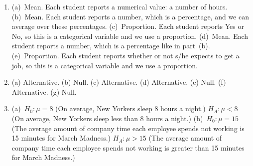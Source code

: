 \documentclass[
  10pt,
  openany]{book}
\providecommand{\tightlist}{%
  \setlength{\itemsep}{0pt}\setlength{\parskip}{0pt}}
\begin{document}
\begin{enumerate}
\def\labelenumi{\arabic{enumi}.}
\tightlist
\item
  (a)~Mean. Each student reports a numerical value: a number of hours. (b)~Mean. Each student reports a number, which is a percentage, and we can average over these percentages. (c)~Proportion. Each student reports Yes or No, so this is a categorical variable and we use a proportion. (d)~Mean. Each student reports a number, which is a percentage like in part~(b). (e)~Proportion. Each student reports whether or not s/he expects to get a job, so this is a categorical variable and we use a proportion.

  \addtocounter{enumi}{1}
\item
  (a) Alternative. (b) Null. (c) Alternative. (d) Alternative. (e) Null. (f) Alternative. (g) Null.

  \addtocounter{enumi}{1}
\item
  (a)~\(H_0: \mu = 8\) (On average, New Yorkers sleep 8 hours a night.) \(H_A: \mu < 8\) (On average, New Yorkers sleep less than 8 hours a night.) (b)~\(H_0: \mu = 15\) (The average amount of company time each employee spends not working is 15 minutes for March Madness.) \(H_A: \mu > 15\) (The average amount of company time each employee spends not working is greater than 15 minutes for March Madness.)


\end{enumerate}
\end{document}
